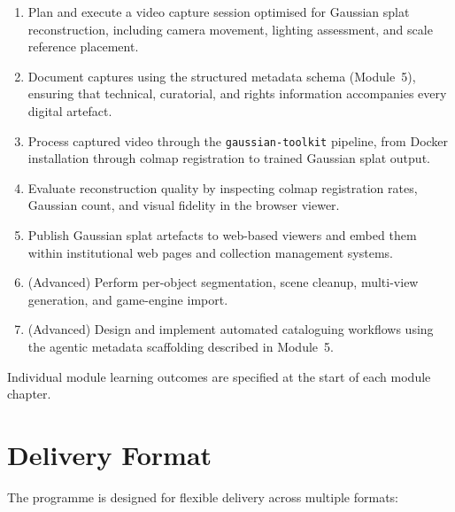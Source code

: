 \begin{enumerate}
  \item Plan and execute a video capture session optimised for Gaussian splat reconstruction, including camera movement, lighting assessment, and scale reference placement.

  \item Document captures using the structured metadata schema (Module~5), ensuring that technical, curatorial, and rights information accompanies every digital artefact.

  \item Process captured video through the \texttt{gaussian-toolkit} pipeline, from Docker installation through \acrshort{colmap} registration to trained Gaussian splat output.

  \item Evaluate reconstruction quality by inspecting \acrshort{colmap} registration rates, Gaussian count, and visual fidelity in the browser viewer.

  \item Publish Gaussian splat artefacts to web-based viewers and embed them within institutional web pages and collection management systems.

  \item (Advanced) Perform per-object segmentation, scene cleanup, multi-view generation, and game-engine import.

  \item (Advanced) Design and implement automated cataloguing workflows using the agentic metadata scaffolding described in Module~5.
\end{enumerate}

Individual module learning outcomes are specified at the start of each module chapter.

\section{Delivery Format}
\label{sec:train-delivery}

The programme is designed for flexible delivery across multiple formats:

